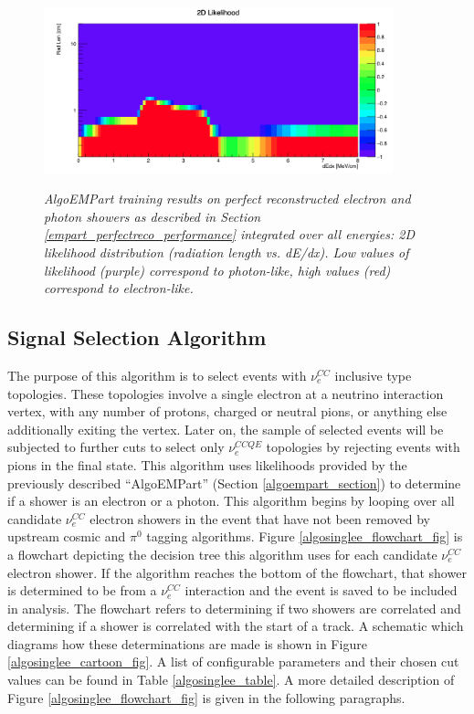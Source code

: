 \begin{figure}[ht!]
\centering
\includegraphics[width=0.9\textwidth]{Figures/EMPartTraining/mc_trained/2DRatio.png}\\
\caption{\textit{AlgoEMPart training results on perfect reconstructed electron and photon showers as described in Section \ref{empart_perfectreco_performance} integrated over all energies: 2D likelihood distribution (radiation length vs. dE/dx). Low values of likelihood (purple) correspond to photon-like, high values (red) correspond to electron-like.}}
\label{empart_perfectreco_performance_fig1}
\end{figure}






\subsection{Signal Selection Algorithm}

The purpose of this algorithm is to select events with $\nu_e^{CC}$ inclusive type topologies. These topologies involve a single electron at a neutrino interaction vertex, with any number of protons, charged or neutral pions, or anything else additionally exiting the vertex. Later on, the sample of selected events will be subjected to further cuts to select only $\nu_e^{CCQE}$ topologies by rejecting events with pions in the final state. This algorithm uses likelihoods provided by the previously described ``AlgoEMPart'' (Section \ref{algoempart_section}) to determine if a shower is an electron or a photon. This algorithm begins by looping over all candidate $\nu_e^{CC}$ electron showers in the event that have not been removed by upstream cosmic and $\pi^0$ tagging algorithms. Figure \ref{algosinglee_flowchart_fig} is a flowchart depicting the decision tree this algorithm uses for each candidate $\nu_e^{CC}$ electron shower. If the algorithm reaches the bottom of the flowchart, that shower is determined to be from a $\nu_e^{CC}$ interaction and the event is saved to be included in analysis. The flowchart refers to determining if two showers are correlated and determining if a shower is correlated with the start of a track. A schematic which diagrams how these determinations are made is shown in Figure \ref{algosinglee_cartoon_fig}. A list of configurable parameters and their chosen cut values can be found in Table \ref{algosinglee_table}. A more detailed description of Figure \ref{algosinglee_flowchart_fig} is given in the following paragraphs.\\


